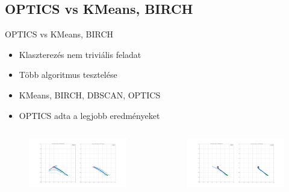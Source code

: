 \documentclass{beamer}
\begin{document}
\subsection{OPTICS vs KMeans, BIRCH}
\begin{frame}{OPTICS vs KMeans, BIRCH}
    \begin{itemize}
        \item Klaszterezés nem triviális feladat
        \item Több algoritmus tesztelése
        \item KMeans, BIRCH, DBSCAN, OPTICS
        \item OPTICS adta a legjobb eredményeket 
    \end{itemize}
    \begin{columns}
        \begin{figure}
            \includegraphics[scale=0.08]{../bad_clustering/example_kmeans_vs_optics.png}
        \end{figure}
        \begin{figure}
            \includegraphics[scale=0.08]{../bad_clustering/example_birch_vs_optics.png}
        \end{figure}
    \end{columns}
\end{frame}
\end{document}
